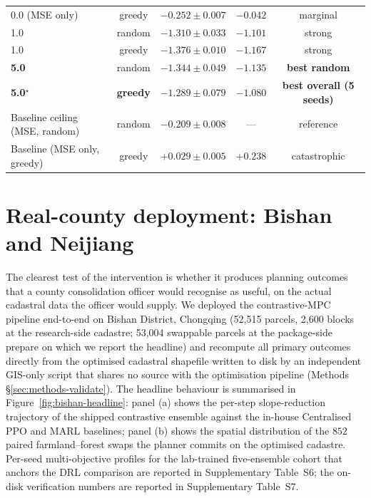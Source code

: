 \documentclass[11pt]{article}
\begin{document}
\begin{table}[htbp]
\begin{tabular}{lccccc}
0.0 (MSE only)                  & greedy & \multicolumn{2}{c}{$-0.252 \pm 0.007$} & $-0.042$ & marginal \\
1.0                             & random & \multicolumn{2}{c}{$-1.310 \pm 0.033$} & $-1.101$ & strong \\
1.0                             & greedy & \multicolumn{2}{c}{$-1.376 \pm 0.010$} & $-1.167$ & strong \\
\textbf{5.0}                    & random & \multicolumn{2}{c}{$\mathbf{-1.344 \pm 0.049}$} & $-1.135$ & \textbf{best random} \\
\textbf{5.0}$^{\star}$          & \textbf{greedy} & \multicolumn{2}{c}{$\mathbf{-1.289 \pm 0.079}$} & $\mathbf{-1.080}$ & \textbf{best overall (5 seeds)} \\
Baseline ceiling (MSE, random)  & random & \multicolumn{2}{c}{$-0.209 \pm 0.008$} & --- & reference \\
Baseline (MSE only, greedy)     & greedy & \multicolumn{2}{c}{$+0.029 \pm 0.005$} & $+0.238$ & catastrophic \\
\bottomrule
\end{tabular}
\end{table}

\section{Real-county deployment: Bishan and Neijiang}\label{sec:counties}

The clearest test of the intervention is whether it produces planning outcomes that a county consolidation officer would recognise as useful, on the actual cadastral data the officer would supply. We deployed the contrastive-MPC pipeline end-to-end on Bishan District, Chongqing (52{,}515 parcels, 2{,}600 blocks at the research-side cadastre; 53{,}004 swappable parcels at the package-side prepare on which we report the headline) and recompute all primary outcomes directly from the optimised cadastral shapefile written to disk by an independent GIS-only script that shares no source with the optimisation pipeline (Methods \S\ref{sec:methods-validate}). The headline behaviour is summarised in Figure~\ref{fig:bishan-headline}: panel (a) shows the per-step slope-reduction trajectory of the shipped contrastive ensemble against the in-house Centralised PPO and MARL baselines; panel (b) shows the spatial distribution of the $852$ paired farmland--forest swaps the planner commits on the optimised cadastre. Per-seed multi-objective profiles for the lab-trained five-ensemble cohort that anchors the DRL comparison are reported in Supplementary Table~S6; the on-disk verification numbers are reported in Supplementary Table~S7.
\end{document}
